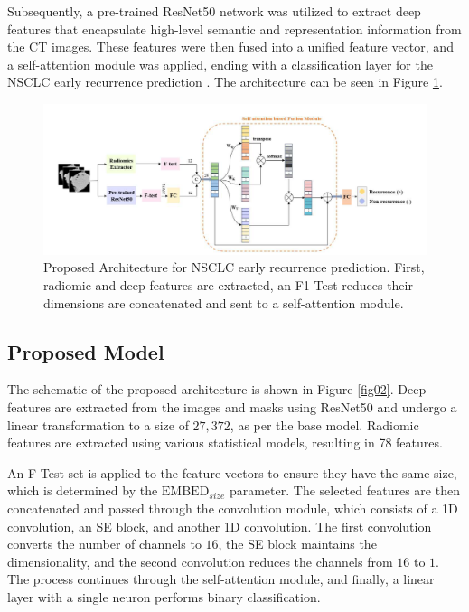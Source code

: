 \documentclass[journal,twoside,web]{ieeecolor}
\begin{document}
Subsequently, a pre-trained ResNet50 network was utilized to extract deep features that encapsulate high-level semantic and representation information from the \gls{CT} images. These features were then fused into a unified feature vector, and a self-attention module was applied, ending with a classification layer for the \gls{NSCLC} early recurrence prediction \cite{aiSelfAttentionBasedFusion2023}. The architecture can be seen in Figure \ref{fig01}.


\begin{figure}[h]
\centerline{\includegraphics[width=\columnwidth]{figures/fig01.png}}
\caption{Proposed  Architecture for \gls{NSCLC} early recurrence prediction. First, radiomic and deep features are extracted, an F1-Test reduces their dimensions are concatenated and sent to a self-attention module.}
\label{fig01}
\end{figure}

\subsection{Proposed Model}

The schematic of the proposed architecture is shown in Figure \ref{fig02}. Deep features are extracted from the images and masks using ResNet50 and undergo a linear transformation to a size of $27,372$, as per the base model. Radiomic features are extracted using various statistical models, resulting in 78 features.

An F-Test set is applied to the feature vectors to ensure they have the same size, which is determined by the $\text{EMBED}_{size}$ parameter. The selected features are then concatenated and passed through the convolution module, which consists of a 1D convolution, an \gls{SE} block, and another 1D convolution. The first convolution converts the number of channels to $16$, the SE block maintains the dimensionality, and the second convolution reduces the channels from $16$ to $1$. The process continues through the self-attention module, and finally, a linear layer with a single neuron performs binary classification.
\end{document}
